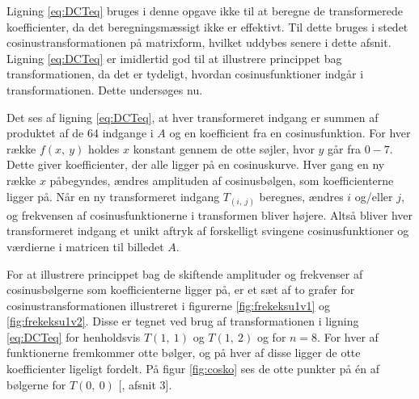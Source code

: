 Ligning \ref{eq:DCTeq} bruges i denne opgave ikke til at beregne de transformerede koefficienter, da det beregningsmæssigt ikke er effektivt. Til dette bruges i stedet cosinustransformationen på matrixform, hvilket uddybes senere i dette afsnit. Ligning \ref{eq:DCTeq} er imidlertid god til at illustrere princippet bag transformationen, da det er tydeligt, hvordan cosinusfunktioner indgår i transformationen. Dette undersøges nu.

Det ses af ligning \vref{eq:DCTeq}, at hver transformeret indgang er summen af produktet af de 64 indgange i $A$ og en koefficient fra en cosinusfunktion. For hver række $f(x,\ y)$ holdes $x$ konstant gennem de otte søjler, hvor $y$ går fra $0-7$. Dette giver koefficienter, der alle ligger på en cosinuskurve. Hver gang en ny række $x$ påbegyndes, ændres amplituden af cosinusbølgen, som koefficienterne ligger på. Når en ny transformeret indgang $T_{(i,\ j)}$ beregnes, ændres $i$ og/eller $j$, og frekvensen af cosinusfunktionerne i transformen bliver højere. Altså bliver hver transformeret indgang et unikt aftryk af forskelligt svingene cosinusfunktioner og værdierne i matricen til billedet $A$.

For at illustrere princippet bag de skiftende amplituder og frekvenser af cosinusbølgerne som koefficienterne ligger på, er et sæt af to grafer for cosinustransformationen illustreret i figurerne \ref{fig:frekeksu1v1} og \ref{fig:frekeksu1v2}. Disse er tegnet ved brug af transformationen i ligning \vref{eq:DCTeq} for henholdsvis $T(1,\ 1)$ og $T(1,\ 2)$ og for $n=8$. For hver af funktionerne fremkommer otte bølger, og på hver af disse ligger de otte koefficienter ligeligt fordelt. På figur \ref{fig:cosko} ses de otte punkter på én af bølgerne for $T(0,\ 0)$ [\citet{whydomath_dct}, afsnit 3].

